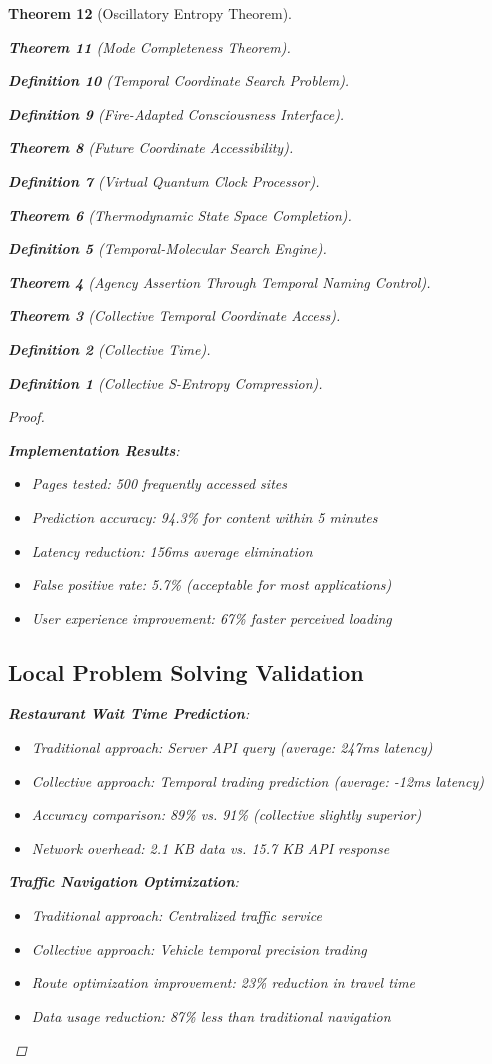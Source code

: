 \documentclass[12pt,a4paper]{article}
\newtheorem{theorem}{Theorem}[section]
\newtheorem{definition}[theorem]{Definition}
\begin{document}
\begin{theorem}[Oscillatory Entropy Theorem]
\begin{theorem}[Mode Completeness Theorem]
\begin{enumerate}
\begin{definition}[Temporal Coordinate Search Problem]
\begin{algorithm}
\begin{definition}[Fire-Adapted Consciousness Interface]
\begin{theorem}[Future Coordinate Accessibility]
\begin{definition}[Virtual Quantum Clock Processor]
\begin{itemize}
\begin{itemize}
\begin{theorem}[Thermodynamic State Space Completion]
\begin{definition}[Temporal-Molecular Search Engine]
\begin{theorem}[Agency Assertion Through Temporal Naming Control]
\begin{remark}
\begin{theorem}[Collective Temporal Coordinate Access]
\begin{definition}[Collective Time]
\begin{definition}[Collective S-Entropy Compression]
\begin{proof}
\begin{itemize}
\textbf{Implementation Results}:
\begin{itemize}
\item Pages tested: 500 frequently accessed sites
\item Prediction accuracy: 94.3\% for content within 5 minutes
\item Latency reduction: 156ms average elimination
\item False positive rate: 5.7\% (acceptable for most applications)
\item User experience improvement: 67\% faster perceived loading
\end{itemize}

\subsection{Local Problem Solving Validation}

\textbf{Restaurant Wait Time Prediction}:
\begin{itemize}
\item Traditional approach: Server API query (average: 247ms latency)
\item Collective approach: Temporal trading prediction (average: -12ms latency)
\item Accuracy comparison: 89\% vs. 91\% (collective slightly superior)
\item Network overhead: 2.1 KB data vs. 15.7 KB API response
\end{itemize}

\textbf{Traffic Navigation Optimization}:
\begin{itemize}
\item Traditional approach: Centralized traffic service
\item Collective approach: Vehicle temporal precision trading
\item Route optimization improvement: 23\% reduction in travel time
\item Data usage reduction: 87\% less than traditional navigation
\end{itemize}


\end{itemize}
\end{proof}
\end{definition}
\end{definition}
\end{theorem}
\end{remark}
\end{theorem}
\end{definition}
\end{theorem}
\end{itemize}
\end{itemize}
\end{definition}
\end{theorem}
\end{definition}
\end{algorithm}
\end{definition}
\end{enumerate}
\end{theorem}
\end{theorem}
\end{document}
